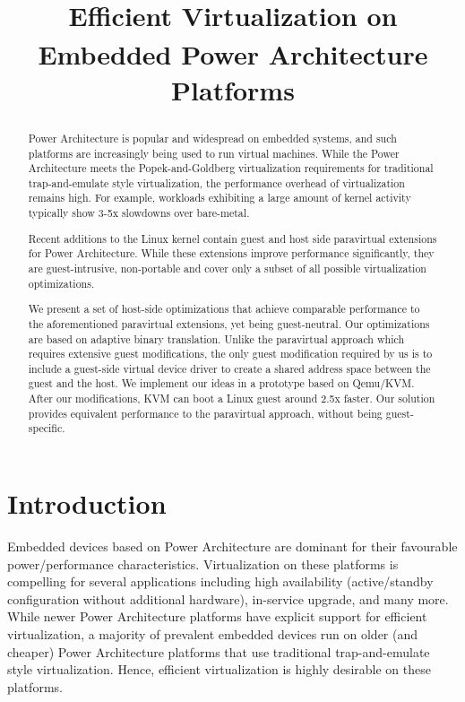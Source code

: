 \documentclass[10pt,twocolumn]{article}
\begin{document}
\title{Efficient Virtualization on Embedded Power Architecture\textsuperscript{\textregistered} Platforms}
\author{}
\date{}
\maketitle
\thispagestyle{empty}

\maketitle
\begin{abstract}
  Power Architecture\textsuperscript{\textregistered} is popular and widespread on embedded systems, and such
  platforms are
  increasingly
  being used to run virtual machines\cite{embedded_virtualization, KVM_on_embedded_Power}. While the Power
  Architecture meets the
  Popek-and-Goldberg virtualization requirements for traditional trap-and-emulate
  style virtualization, the performance overhead of virtualization remains high.
  For example, workloads exhibiting a large amount of kernel activity typically
  show 3-5x slowdowns over bare-metal.

  Recent additions to the Linux kernel contain guest and host side paravirtual
  extensions for Power Architecture. While these extensions improve performance
  significantly, they
  are guest-intrusive, non-portable and cover only a subset of all possible
  virtualization optimizations.

  We present a set of host-side optimizations that achieve comparable
  performance
  to the aforementioned paravirtual extensions, yet being
  guest-neutral. Our optimizations are based on adaptive binary translation.
  Unlike the paravirtual approach which requires extensive
  guest modifications, the only
  guest modification required by us is to include a guest-side virtual device driver
  to create a shared address space between the guest and the host.
  We implement our ideas in a prototype based on Qemu/KVM.
  After our modifications, KVM can boot a Linux guest around 2.5x faster. Our solution
  provides equivalent performance to
  the paravirtual approach, without being guest-specific.
\end{abstract}
\section{Introduction}
Embedded devices based on Power Architecture are dominant for their
favourable power/performance characteristics. Virtualization on these platforms is
compelling for several applications including high availability (active/standby
configuration without additional hardware), in-service upgrade, and many
more\cite{embedded_virtualization, KVM_on_embedded_Power}. While newer Power
Architecture platforms
have explicit support for efficient virtualization\cite{freescale_embedded_hyperv, hwassists_hyperv}, a majority of
prevalent embedded devices run on older (and cheaper) Power Architecture platforms that use
traditional trap-and-emulate style virtualization\cite{popekgoldberg}. Hence, efficient
virtualization is highly desirable on these platforms.
\end{document}
